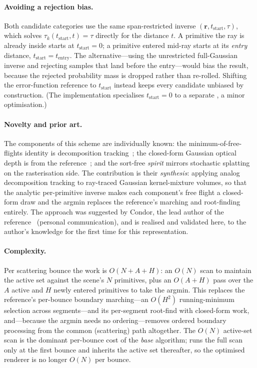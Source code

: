 \paragraph{Avoiding a rejection bias.} Both candidate categories use the same span-restricted inverse
$(\bm{r}, t_{\text{start}}, \tau)$, which solves $\tau_k(t_{\text{start}}, t) =
\tau$ directly for the distance $t$. A primitive the ray is already inside starts at $t_{\text{start}}=0$;
a primitive entered mid-ray starts at its \emph{entry} distance, $t_{\text{start}}=t_{\text{entry}}$. The
alternative---using the unrestricted full-Gaussian inverse and rejecting samples that land before the
entry---would bias the result, because the rejected probability mass is dropped rather than re-rolled.
Shifting the error-function reference to $t_{\text{start}}$ instead keeps every candidate unbiased by
construction. (The implementation specialises $t_{\text{start}}=0$ to a separate , a
minor optimisation.)

\paragraph{Novelty and prior art.} The components of this scheme are individually known: the
minimum-of-free-flights identity is decomposition tracking~\cite{Kutz2017}; the closed-form Gaussian
optical depth is from the reference~\cite{DSYG}; and the sort-free \emph{spirit} mirrors stochastic
splatting~\cite{StochasticSplats2025} on the rasterisation side. The contribution is their
\emph{synthesis}: applying analog decomposition tracking to ray-traced Gaussian kernel-mixture volumes,
so that the analytic per-primitive inverse makes each component's free flight a closed-form draw and
the argmin replaces the reference's marching and root-finding entirely. The approach was suggested by
Condor, the lead author of the reference~\cite{DSYG} (personal communication), and is realised and
validated here, to the author's knowledge for the first time for this representation.

\paragraph{Complexity.} Per scattering bounce the work is $O(N + A + H)$: an $O(N)$ scan to maintain the
active set against the scene's $N$ primitives, plus an $O(A + H)$ pass over the $A$ active and $H$
newly entered primitives to take the argmin. This replaces the reference's per-bounce boundary
marching---an $O(H^2)$ running-minimum selection across segments---and its per-segment root-find with
closed-form work, and---because the argmin needs no ordering---removes ordered boundary processing
from the common (scattering) path altogether. The $O(N)$ active-set
scan is the dominant per-bounce cost of the \emph{base} algorithm;  runs the full
scan only at the first bounce and inherits the active set thereafter, so the optimised renderer is no
longer $O(N)$ per bounce.


